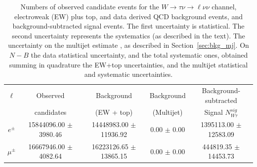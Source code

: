 \begin{table}[h]
\begin{center}
\begin{tabular}{ | c || c || c | c || c |  }
\hline
$\ell$ & Observed   &  Background & Background & Background-subtracted \\
        & candidates & (EW + top)  & (Multijet) & Signal $N_{W\tau}^{sig}$ \\
\hline
\hline
$e^{\pm}$ & 15844096.00 $\pm$ 3980.46 & 14448983.00 $\pm$ 11936.92 & 0.00 $\pm$ 0.00 & 1395113.00 $\pm$ 12583.09\\
\hline
$\mu^{\pm}$ & 16667946.00 $\pm$ 4082.64 & 16223126.65 $\pm$ 13865.15 & 0.00 $\pm$ 0.00 & 444819.35 $\pm$ 14453.73\\
\hline
\end{tabular}
\caption{
Numbers of observed candidate events for the $W \rightarrow \tau\nu \rightarrow \ell\nu\nu$ channel, electroweak (EW) plus top, and data derived QCD background events, and background-subtracted signal events.
The first uncertainty is statistical.
The second uncertainty represents the systematics (as described in the text).
The uncertainty on the multijet estimate , as described in Section~\ref{sec:bkg_mj}.
On $N - B$ the data statistical uncertainty, and the total systematic ones, obtained summing in quadrature the EW+top uncertainties, and the multijet statistical and systematic uncertainties.
}
\label{tbl:SR_observed_candidates}
\end{center}
\end{table}


